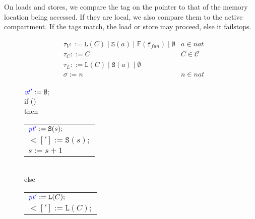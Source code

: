 \documentclass{article}
\begin{document}
On loads and stores, we compare the tag on the pointer to that of the memory location
being accessed. If they are local, we also compare them to the active compartment.
If the tags match, the load or store may proceed, else it failstops.

\begin{figure}
    \begin{minipage}{0.55\textwidth}
\[\begin{aligned}
  & \tau_V ::= \mathtt{L}(C) \mid \mathtt{S}(a) \mid \mathbb{F}(\mathtt{f}_{fun}) \mid \emptyset & a \in \mathit{nat} \\
  & \tau_C ::= C & C \in \mathcal{C} \\
  & \tau_L ::= \mathtt{L}(C) \mid \mathtt{S}(a) \mid \emptyset \\
  & \sigma := n & n \in \mathit{nat} \\
  \end{aligned}\]
  \end{minipage}
  \begin{minipage}{0.4\textwidth}
  \end{minipage}
\begin{minipage}{0.3\textwidth}
             {\(\vt['] := \emptyset;\) \\
               if () \\
               then \begin{tabular}[t]{l}
                 \(\pt['] := \mathtt{S}(s);\) \\
                 \(\lt['] := \mathtt{S}(s);\) \\
                 \(s := s+1\)
               \end{tabular} \\ 
               else \begin{tabular}[t]{l}
                 \(\pt['] := \mathtt{L}(C);\) \\
                 \(\lt['] := \mathtt{L}(C);\) \\
               \end{tabular} \\
  }
\end{minipage}

\end{figure}
\end{document}
